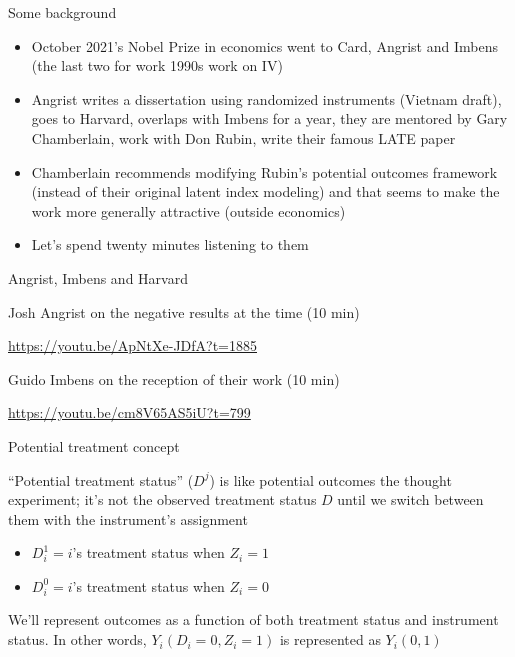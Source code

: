 \documentclass{beamer}
\begin{document}
\begin{frame}{Some background}

\begin{itemize}
\item October 2021's Nobel Prize in economics went to Card, Angrist and Imbens (the last two for work 1990s work on IV)
\item Angrist writes a dissertation using randomized instruments (Vietnam draft), goes to Harvard, overlaps with Imbens for a year, they are mentored by Gary Chamberlain, work with Don Rubin, write their famous LATE paper
\item Chamberlain recommends modifying Rubin's potential outcomes framework (instead of their original latent index modeling) and that seems to make the work more generally attractive (outside economics)
\item Let's spend twenty minutes listening to them
\end{itemize}

\end{frame}

\begin{frame}{Angrist, Imbens and Harvard}


Josh Angrist on the negative results at the time (10 min)

\url{https://youtu.be/ApNtXe-JDfA?t=1885}

Guido Imbens on the reception of their work (10 min)

\url{https://youtu.be/cm8V65AS5iU?t=799}

\end{frame}




\begin{frame}{Potential treatment concept}
	
``Potential treatment status'' ($D^j$) is like potential outcomes the thought experiment; it's not the observed treatment status $D$ until we switch between them with the instrument's assignment
\bigskip
		\begin{itemize}
		\item $D^1_{i} = i$'s treatment status when $Z_i=1$
		\item $D^0_{i} = i$'s treatment status when $Z_i=0$
		\end{itemize}
\bigskip
We'll represent outcomes as a function of both treatment status and instrument status. In other words, $Y_i(D_i=0,Z_i=1)$ is represented as $Y_i(0,1)$

\end{frame}
\end{document}
